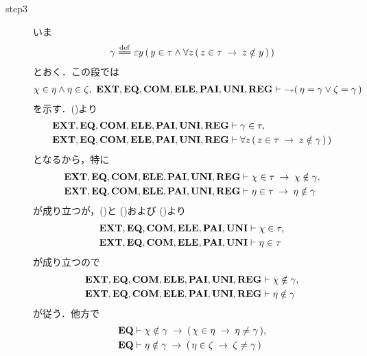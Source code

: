 \begin{sketch}
\begin{description}
			\item[step3]
				いま
				\begin{align}
					\gamma \defeq \varepsilon y\, (\, y \in \tau \wedge \forall z\, (\, z \in \tau \rarrow z \notin y\, )\, )
				\end{align}
				とおく．この段では
				\begin{align}
					\chi \in \eta \wedge \eta \in \zeta,\ 
					\EXTAX,\EQAX,\COMAX,\ELEAX,\PAIAX,\UNIAX,\REGAX \vdash\ 
					\negation (\, \eta = \gamma \vee \zeta = \gamma\, )
				\end{align}
				を示す．()より
				\begin{align}
					\mbox{{\bf EXT}},\mbox{{\bf EQ}},\mbox{\bf COM},\mbox{{\bf ELE}},\mbox{{\bf PAI}},\mbox{{\bf UNI}},\mbox{{\bf REG}} &\vdash \gamma \in \tau, 
					\label{fom:no_three_sets_go_round_13} \\
					\mbox{{\bf EXT}},\mbox{{\bf EQ}},\mbox{\bf COM},\mbox{{\bf ELE}},\mbox{{\bf PAI}},\mbox{{\bf UNI}},\mbox{{\bf REG}} &\vdash 
					\forall z\, (\, z \in \tau \hspace{0.25em}\rightarrow\hspace{0.25em} z \notin \gamma\, )\, )
					\label{fom:no_three_sets_go_round_14}
				\end{align}
				となるから，特に
				\begin{align}
					\mbox{{\bf EXT}},\mbox{{\bf EQ}},\mbox{\bf COM},\mbox{{\bf ELE}},\mbox{{\bf PAI}},\mbox{{\bf UNI}},\mbox{{\bf REG}} &\vdash 
					\chi \in \tau \hspace{0.25em}\rightarrow\hspace{0.25em} \chi \notin \gamma, \\
					\mbox{{\bf EXT}},\mbox{{\bf EQ}},\mbox{\bf COM},\mbox{{\bf ELE}},\mbox{{\bf PAI}},\mbox{{\bf UNI}},\mbox{{\bf REG}} &\vdash 
					\eta \in \tau \hspace{0.25em}\rightarrow\hspace{0.25em} \eta \notin \gamma
				\end{align}
				が成り立つが，()と
				()および
				()より
				\begin{align}
					\mbox{{\bf EXT}},\mbox{{\bf EQ}},\mbox{\bf COM},\mbox{{\bf ELE}},\mbox{{\bf PAI}},\mbox{{\bf UNI}} &\vdash \chi \in \tau, \\
					\mbox{{\bf EXT}},\mbox{{\bf EQ}},\mbox{\bf COM},\mbox{{\bf ELE}},\mbox{{\bf PAI}},\mbox{{\bf UNI}} &\vdash \eta \in \tau
				\end{align}
				が成り立つので
				\begin{align}
					\mbox{{\bf EXT}},\mbox{{\bf EQ}},\mbox{\bf COM},\mbox{{\bf ELE}},\mbox{{\bf PAI}},\mbox{{\bf UNI}},\mbox{{\bf REG}} &\vdash 
					\chi \notin \gamma, \label{fom:no_three_sets_go_round_15} \\
					\mbox{{\bf EXT}},\mbox{{\bf EQ}},\mbox{\bf COM},\mbox{{\bf ELE}},\mbox{{\bf PAI}},\mbox{{\bf UNI}},\mbox{{\bf REG}} &\vdash 
					\eta \notin \gamma \label{fom:no_three_sets_go_round_16}
				\end{align}
				が従う．他方で
				\begin{align}
					\EQAX &\vdash \chi \notin \gamma \rarrow (\, \chi \in \eta \rarrow \eta \neq \gamma\, ), \\
					\EQAX &\vdash \eta \notin \gamma \rarrow (\, \eta \in \zeta \rarrow \zeta \neq \gamma\, )

\end{align}
\end{description}
\end{sketch}
